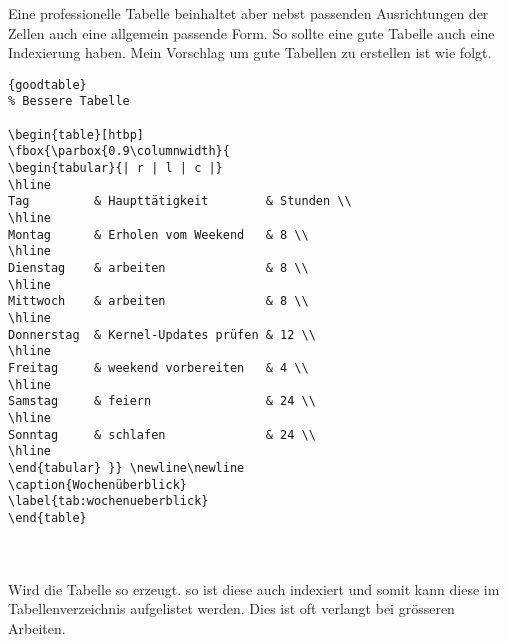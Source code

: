 \noindent
Eine professionelle Tabelle beinhaltet aber nebst passenden
Ausrichtungen der Zellen auch eine allgemein passende Form.
So sollte eine gute Tabelle auch eine Indexierung haben.
Mein Vorschlag um gute Tabellen zu erstellen ist wie folgt.

\begin{center}
\begin{lstlisting}[caption=Bessere Tabelle]{goodtable}
% Bessere Tabelle

\begin{table}[htbp]
\fbox{\parbox{0.9\columnwidth}{
\begin{tabular}{| r | l | c |}
\hline
Tag         & Haupttätigkeit        & Stunden \\
\hline
Montag      & Erholen vom Weekend   & 8 \\
\hline
Dienstag    & arbeiten              & 8 \\
\hline
Mittwoch    & arbeiten              & 8 \\
\hline
Donnerstag  & Kernel-Updates prüfen & 12 \\
\hline
Freitag     & weekend vorbereiten   & 4 \\
\hline
Samstag     & feiern                & 24 \\
\hline
Sonntag     & schlafen              & 24 \\
\hline
\end{tabular} }} \newline\newline
\caption{Wochenüberblick}
\label{tab:wochenueberblick}
\end{table}
\end{lstlisting}
\end{center}


\begin{table}[htbp]
\centering
{} \newline\newline
\caption{Wochenüberblick}
\label{tab:wochenueberblick}
\end{table}\\\\

\noindent
Wird die Tabelle so erzeugt. so ist diese auch indexiert
und somit kann diese im Tabellenverzeichnis aufgelistet
werden. Dies ist oft verlangt bei grösseren Arbeiten.
